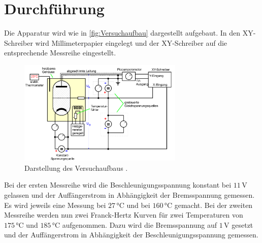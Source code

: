 \section{Durchführung}
\label{sec:Durchführung}
Die Apparatur wird wie in \autoref{fig:Versuchaufbau} dargestellt aufgebaut. In den XY-Schreiber wird
Millimeterpapier eingelegt und der XY-Schreiber auf die entsprechende Messreihe eingestellt.
\begin{figure}
    \centering
    \includegraphics[width=0.7\textwidth]{Bilder/Versuchsaufbau.png}
    \caption{Darstellung des Versuchaufbaus \cite{sample}.}
    \label{fig:Versuchaufbau}
\end{figure}
Bei der ersten Messreihe wird die Beschleunigungsspannung konstant bei $11\,\unit{\volt}$ gelassen und der
Auffängerstrom in Abhängigkeit der Bremsspannung gemessen. Es wird jeweils eine Messung bei
$27\,\unit{\celsius}$ und bei $160\,\unit{\celsius}$ gemacht. Bei der zweiten
Messreihe werden nun zwei Franck-Hertz Kurven für zwei Temperaturen von $175\,\unit{\celsius}$ und
$185\,\unit{\celsius}$ aufgenommen. Dazu wird die Bremsspannung auf $1\,\unit{\volt}$ gesetzt und der
Auffängerstrom in Abhängigkeit der Beschleunigungsspannung gemessen.